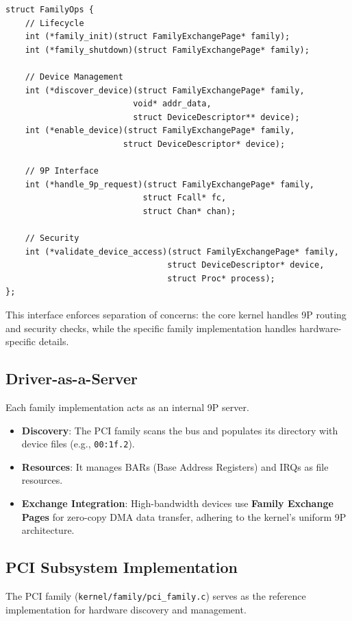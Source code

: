 \documentclass[11pt,letterpaper]{article}
\begin{document}
\begin{lstlisting}
struct FamilyOps {
    // Lifecycle
    int (*family_init)(struct FamilyExchangePage* family);
    int (*family_shutdown)(struct FamilyExchangePage* family);
    
    // Device Management
    int (*discover_device)(struct FamilyExchangePage* family, 
                          void* addr_data, 
                          struct DeviceDescriptor** device);
    int (*enable_device)(struct FamilyExchangePage* family, 
                        struct DeviceDescriptor* device);
    
    // 9P Interface
    int (*handle_9p_request)(struct FamilyExchangePage* family, 
                            struct Fcall* fc, 
                            struct Chan* chan);
    
    // Security
    int (*validate_device_access)(struct FamilyExchangePage* family, 
                                 struct DeviceDescriptor* device, 
                                 struct Proc* process);
};
\end{lstlisting}

This interface enforces separation of concerns: the core kernel handles 9P routing and security checks, while the specific family implementation handles hardware-specific details.

\subsection{Driver-as-a-Server}

Each family implementation acts as an internal 9P server.
\begin{itemize}
\item \textbf{Discovery}: The PCI family scans the bus and populates its directory with device files (e.g., \texttt{00:1f.2}).
\item \textbf{Resources}: It manages BARs (Base Address Registers) and IRQs as file resources.
\item \textbf{Exchange Integration}: High-bandwidth devices use \textbf{Family Exchange Pages} for zero-copy DMA data transfer, adhering to the kernel's uniform 9P architecture.
\end{itemize}

\subsection{PCI Subsystem Implementation}

The PCI family (\texttt{kernel/family/pci_family.c}) serves as the reference implementation for hardware discovery and management.
\end{document}
